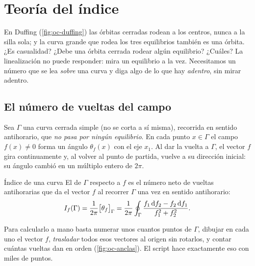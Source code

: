 \section{Teoría del índice}
\label{sec:oc-indice}

En Duffing (\cref{fig:oc-duffing}) las órbitas cerradas rodean a los centros, nunca a la silla sola; y la curva grande que rodea los tres equilibrios también es una órbita. ¿Es casualidad? ¿Debe una órbita cerrada rodear algún equilibrio? ¿Cuáles? La linealización no puede responder: mira un equilibrio a la vez. Necesitamos un número que se lea \emph{sobre} una curva y diga algo de lo que hay \emph{adentro}, sin mirar adentro.

\subsection{El número de vueltas del campo}

Sea $\Gamma$ una curva cerrada simple (no se corta a sí misma), recorrida en sentido antihorario, que \emph{no pasa por ningún equilibrio}. En cada punto $x\in\Gamma$ el campo $f(x)\neq0$ forma un ángulo $\theta_f(x)$ con el eje $x_1$. Al dar la vuelta a $\Gamma$, el vector $f$ gira continuamente y, al volver al punto de partida, vuelve a su dirección inicial: su ángulo cambió en un múltiplo entero de $2\pi$.

\begin{definicion}[label=def:oc-indice]{Índice de una curva}
El  de $\Gamma$ respecto a $f$ es el número neto de vueltas antihorarias que da el vector $f$ al recorrer $\Gamma$ una vez en sentido antihorario:
\[
  I_f(\Gamma)=\frac1{2\pi}\bigl[\theta_f\bigr]_\Gamma=\frac1{2\pi}\oint_\Gamma\frac{f_1\,\mathrm{d} f_2-f_2\,\mathrm{d} f_1}{f_1^2+f_2^2} .
\]
\end{definicion}

Para calcularlo a mano basta numerar unos cuantos puntos de $\Gamma$, dibujar en cada uno el vector $f$, \emph{trasladar} todos esos vectores al origen sin rotarlos, y contar cuántas vueltas dan en orden (\cref{fig:oc-anclas}). El script  hace exactamente eso con miles de puntos.

